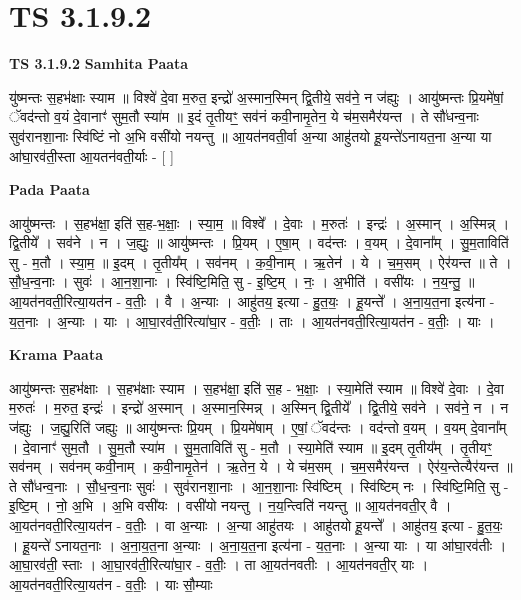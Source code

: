 \documentclass[17pt]{extarticle}
\begin{document}
\section{ TS 3.1.9.2 }

\textbf{TS 3.1.9.2 } \newline
\textbf{Samhita Paata} \newline

यु॑ष्मन्तः स॒हभ॑क्षाः स्याम ॥ विश्वे॑ दे॒वा म॒रुत॒ इन्द्रो॑ अ॒स्मान॒स्मिन् द्वि॒तीये॒ सव॑ने॒ न ज॑ह्युः । आयु॑ष्मन्तः प्रि॒यमे॑षां॒ ॅवद॑न्तो व॒यं दे॒वानाꣳ॑ सुम॒तौ स्या॑म ॥ इ॒दं तृ॒तीयꣳ॒॒ सव॑नं कवी॒नामृ॒तेन॒ ये च॑म॒समैर॑यन्त । ते सौ॑धन्व॒नाः सुव॑रानशा॒नाः स्वि॑ष्टिं नो अ॒भि वसी॑यो नयन्तु ॥ आ॒यत॑नवती॒र्वा अ॒न्या आहु॑तयो हू॒यन्ते॑ऽनायत॒ना अ॒न्या या आ॑घा॒रव॑ती॒स्ता आ॒यतन॑वती॒र्याः - [  ] \newline

\textbf{Pada Paata} \newline

आयु॑ष्मन्तः । स॒हभ॑क्षा॒ इति॑ स॒ह-भ॒क्षाः॒ । स्या॒म॒ ॥ विश्वे᳚ । दे॒वाः । म॒रुतः॑ । इन्द्रः॑ । अ॒स्मान् । अ॒स्मिन्न् । द्वि॒तीये᳚ । सव॑ने । न । ज॒ह्युः॒ ॥ आयु॑ष्मन्तः । प्रि॒यम् । ए॒षा॒म् । वद॑न्तः । व॒यम् । दे॒वाना᳚म् । सु॒म॒ताविति॑ सु - म॒तौ । स्या॒म॒ ॥ इ॒दम् । तृ॒तीय᳚म् । सव॑नम् । क॒वी॒नाम् । ऋ॒तेन॑ । ये । च॒म॒सम् । ऐर॑यन्त ॥ ते । सौ॒ध॒न्व॒नाः । सुवः॑ । आ॒न॒शा॒नाः । स्वि॑ष्टि॒मिति॒ सु - इ॒ष्टि॒म् । नः॒ । अ॒भीति॑ । वसी॑यः । न॒य॒न्तु॒ ॥ आ॒यत॑नवती॒रित्या॒यत॑न - व॒तीः॒ । वै । अ॒न्याः । आहु॑तय॒ इत्या - हु॒त॒यः॒ । हू॒यन्ते᳚ । अ॒ना॒य॒त॒ना इत्य॑ना - य॒त॒नाः । अ॒न्याः । याः । आ॒घा॒रव॑ती॒रित्या॑घा॒र - व॒तीः॒ । ताः । आ॒यत॑नवती॒रित्या॒यत॑न - व॒तीः॒ । याः ।  \newline


\textbf{Krama Paata} \newline

आयु॑ष्मन्तः स॒हभ॑क्षाः । स॒हभ॑क्षाः स्याम । स॒हभ॑क्षा॒ इति॑ स॒ह - भ॒क्षाः॒ । स्या॒मेति॑ स्याम ॥ विश्वे॑ दे॒वाः । दे॒वा म॒रुतः॑ । म॒रुत॒ इन्द्रः॑ । इन्द्रो॑ अ॒स्मान् । अ॒स्मान॒स्मिन्न् । अ॒स्मिन् द्वि॒तीये᳚ । द्वि॒तीये॒ सव॑ने । सव॑ने॒ न । न ज॑ह्युः । ज॒ह्यु॒रिति॑ जह्युः ॥ आयु॑ष्मन्तः प्रि॒यम् । प्रि॒यमे॑षाम् । ए॒षां॒ ॅवद॑न्तः । वद॑न्तो व॒यम् । व॒यम् दे॒वाना᳚म् । दे॒वानाꣳ॑ सुम॒तौ । सु॒म॒तौ स्या॑म । सु॒म॒ताविति॑ सु - म॒तौ । स्या॒मेति॑ स्याम ॥ इ॒दम् तृ॒तीय᳚म् । तृ॒तीयꣳ॒॒ सव॑नम् । सव॑नम् कवी॒नाम् । क॒वी॒नामृ॒तेन॑ । ऋ॒तेन॒ ये । ये च॑म॒सम् । च॒म॒समैर॑यन्त । ऐर॑य॒न्तेत्यैर॑यन्त ॥ ते सौ॑धन्व॒नाः । सौ॒ध॒न्व॒नाः सुवः॑ । सुव॑रानशा॒नाः । आ॒न॒शा॒नाः स्वि॑ष्टिम् । स्वि॑ष्टिम् नः । स्वि॑ष्टि॒मिति॒ सु - इ॒ष्टि॒म् । नो॒ अ॒भि । अ॒भि वसी॑यः । वसी॑यो नयन्तु । न॒य॒न्त्विति॑ नयन्तु ॥ आ॒यत॑नवती॒र् वै । आ॒यत॑नवती॒रित्या॒यत॑न - व॒तीः॒ । वा अ॒न्याः । अ॒न्या आहु॑तयः । आहु॑तयो हू॒यन्ते᳚ । आहु॑तय॒ इत्या - हु॒त॒यः॒ । हू॒यन्ते॑ ऽनायत॒नाः । अ॒ना॒य॒त॒ना अ॒न्याः । अ॒ना॒य॒त॒ना इत्य॑ना - य॒त॒नाः । अ॒न्या याः । या आ॑घा॒रव॑तीः । आ॒घा॒रव॑ती॒ स्ताः । आ॒घा॒रव॑ती॒रित्या॑घा॒र - व॒तीः॒ । ता आ॒यत॑नवतीः । आ॒यत॑नवती॒र् याः । आ॒यत॑नवती॒रित्या॒यत॑न - व॒तीः॒ । याः सौ॒म्याः \newline
\end{document}
